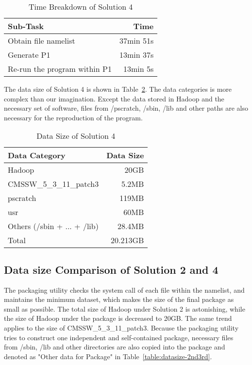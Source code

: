 \documentclass{acm_proc_article-sp}
\begin{document}
\begin{table}
    \centering
    \begin{tabular}{|l|r|}
    \hline
    Sub-Task & Time \\ \hline
    Obtain file namelist & 37min 51s \\ \hline
    Generate P1 & 13min 37s \\ \hline
    Re-run the program within P1 & 13min 5s \\ \hline
    \end{tabular}
    \caption{Time Breakdown of Solution 4}
    \label{table:time-3rd}
\end{table}

The data size of Solution 4 is shown in Table~\ref{table:datasize-3rd}. The
data categories is more complex than our imagination. Except the data stored in
Hadoop and the necessary set of software, files from /pscratch, /sbin, /lib and other
paths are also necessary for the reproduction of the program.

\begin{table}
    \centering
    \begin{tabular}{|l|r|}
    \hline
    Data Category & Data Size \\ \hline
    Hadoop & 20GB \\ \hline
    CMSSW\_5\_3\_11\_patch3 & 5.2MB \\ \hline
    pscratch & 119MB \\ \hline
    usr & 60MB \\ \hline
    Others (/sbin + ... + /lib) & 28.4MB \\ \hline
    Total & 20.213GB \\ \hline
    \end{tabular}
    \caption{Data Size of Solution 4}
    \label{table:datasize-3rd}
\end{table}    

\subsection{ Data size Comparison of Solution 2 and 4}

The packaging utility checks the system call of each file within the namelist,
and maintains the minimum dataset, which makes the size of the final package 
as small as possible. The total size of Hadoop under Solution 2 is astonishing,
while the size of Hadoop under the package is decreased to 20GB. The same trend
applies to the size of CMSSW\_5\_3\_11\_patch3. Because the packaging utility
tries to construct one independent and self-contained package, necessary files
from /sbin, /lib and other directories are also copied into the package and
denoted as "Other data for Package" in Table~\ref{table:datasize-2nd3rd}.
\end{document}
